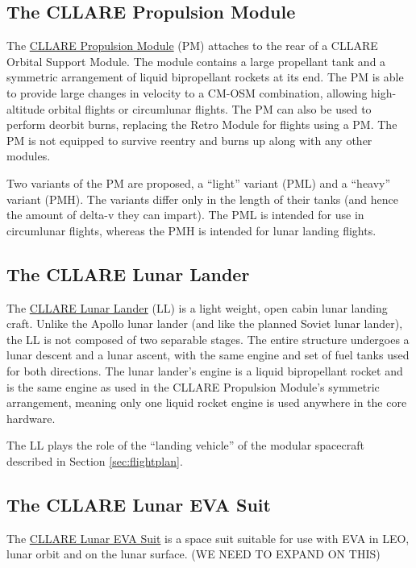 \documentclass{report}
\begin{document}
\subsection{The CLLARE Propulsion Module}

The \href{http://cstart.org/wiki/CLLARE_Propulsion_Module}{CLLARE Propulsion Module} (PM) attaches to the rear of a CLLARE Orbital Support Module.  The module contains a large propellant tank and a symmetric arrangement of liquid bipropellant rockets at its end.  The PM is able to provide large changes in velocity to a CM-OSM combination, allowing high-altitude orbital flights or circumlunar flights.  The PM can also be used to perform deorbit burns, replacing the Retro Module for flights using a PM.  The PM is not equipped to survive reentry and burns up along with any other modules.

Two variants of the PM are proposed, a ``light'' variant (PML) and a ``heavy'' variant (PMH).  The variants differ only in the length of their tanks (and hence the amount of delta-v they can impart). The PML is intended for use in circumlunar flights, whereas the PMH is intended for lunar landing flights.

\subsection{The CLLARE Lunar Lander}

The \href{http://cstart.org/wiki/CLLARE_Lunar_Lander}{CLLARE Lunar Lander} (LL) is a light weight, open cabin lunar landing craft.  Unlike the Apollo lunar lander (and like the planned Soviet lunar lander), the LL is not composed of two separable stages.  The entire structure undergoes a lunar descent and a lunar ascent, with the same engine and set of fuel tanks used for both directions.  The lunar lander's engine is a liquid bipropellant rocket and is the same engine as used in the CLLARE Propulsion Module's symmetric arrangement, meaning only one liquid rocket engine is used anywhere in the core hardware.

The LL plays the role of the ``landing vehicle'' of the modular spacecraft described in Section \ref{sec:flightplan}.

\subsection{The CLLARE Lunar EVA Suit}

The \href{http://cstart.org/wiki/CLLARE_Lunar_EVA_Suit}{CLLARE Lunar EVA Suit} is a space suit suitable for use with EVA in LEO, lunar orbit and on the lunar surface.  (WE NEED TO EXPAND ON THIS)
\end{document}

